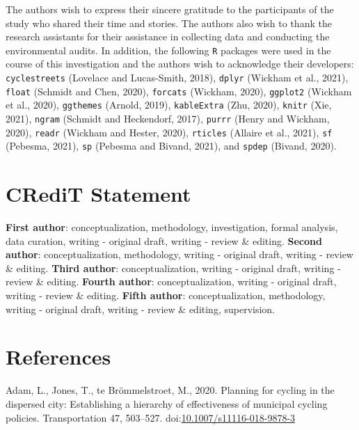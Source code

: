 \documentclass[]{elsarticle} %
\begin{document}
The authors wish to express their sincere gratitude to the participants
of the study who shared their time and stories. The authors also wish to
thank the research assistants for their assistance in collecting data
and conducting the environmental audits. In addition, the following
\texttt{R} packages were used in the course of this investigation and
the authors wish to acknowledge their developers: \texttt{cyclestreets}
(Lovelace and Lucas-Smith, 2018), \texttt{dplyr} (Wickham et al., 2021),
\texttt{float} (Schmidt and Chen, 2020), \texttt{forcats} (Wickham,
2020), \texttt{ggplot2} (Wickham et al., 2020), \texttt{ggthemes}
(Arnold, 2019), \texttt{kableExtra} (Zhu, 2020), \texttt{knitr} (Xie,
2021), \texttt{ngram} (Schmidt and Heckendorf, 2017), \texttt{purrr}
(Henry and Wickham, 2020), \texttt{readr} (Wickham and Hester, 2020),
\texttt{rticles} (Allaire et al., 2021), \texttt{sf} (Pebesma, 2021),
\texttt{sp} (Pebesma and Bivand, 2021), and \texttt{spdep} (Bivand,
2020).

\hypertarget{sec:credit}{%
\section{CRediT Statement}\label{sec:credit}}

\textbf{First author}: conceptualization, methodology, investigation,
formal analysis, data curation, writing - original draft, writing -
review \& editing. \textbf{Second author}: conceptualization,
methodology, writing - original draft, writing - review \& editing.
\textbf{Third author}: conceptualization, writing - original draft,
writing - review \& editing. \textbf{Fourth author}: conceptualization,
writing - original draft, writing - review \& editing. \textbf{Fifth
author}: conceptualization, methodology, writing - original draft,
writing - review \& editing, supervision.

\hypertarget{sec:references}{%
\section*{References}\label{sec:references}}

\hypertarget{refs}{}
\leavevmode\hypertarget{ref-adamPlanningCyclingDispersed2020}{}%
Adam, L., Jones, T., te Brömmelstroet, M., 2020. Planning for cycling in
the dispersed city: Establishing a hierarchy of effectiveness of
municipal cycling policies. Transportation 47, 503--527.
doi:\href{https://doi.org/10.1007/s11116-018-9878-3}{10.1007/s11116-018-9878-3}
\end{document}
